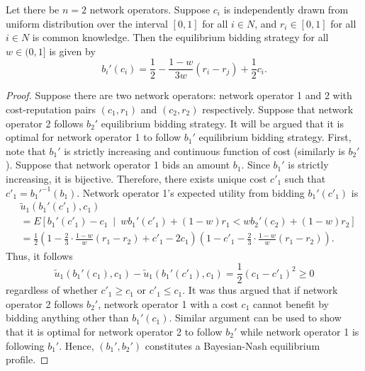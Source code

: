 \begin{propositiona}[\ref{prop:pcomp_equi_bidding_str_direct}]
Let there be $n=2$ network operators. Suppose $c_i$ is independently drawn from uniform distribution over the interval $[0,1]$ for all $i\in N$, and $r_i\in [0,1]$ for all $i\in N$ is common knowledge. Then the equilibrium bidding strategy for all $w\in (0,1]$ is given by
\begin{equation}
	b_i'(c_i) = \frac{1}{2} - \frac{1-w}{3w}(r_i-r_j) + \frac{1}{2}c_i.
\end{equation}
\end{propositiona}
\begin{proof}
Suppose there are two network operators: network operator 1 and 2 with cost-reputation pairs $(c_1,r_1)$ and $(c_2,r_2)$ respectively. Suppose that network operator 2 follows $b_2'$ equilibrium bidding strategy. It will be argued that it is optimal for network operator 1 to follow $b_1'$ equilibrium bidding strategy. First, note that $b_1'$ is strictly increasing and continuous function of cost (similarly is $b_2'$). Suppose that network operator 1 bids an amount $b_1$. Since $b_1'$ is strictly increasing, it is bijective. Therefore, there exists unique cost $c'_1$ such that $c'_1 = {b_1'}^{-1}(b_1)$. Network operator 1's expected utility from bidding $b_1'(c'_1)$ is
\begin{align}
	&\tilde{u}_1(b_1'(c'_1), c_1) \\\nonumber
	&= E \left[ b_1'(c'_1) - c_1 \:\middle\vert\: wb_1'(c'_1) + (1-w)r_1 < wb_2'(c_2) + (1-w)r_2 \right] \\\nonumber
	&= \frac{1}{2} \left( 1 - \frac{2}{3}\cdot\frac{1-w}{w}(r_1-r_2) + c'_1 - 2c_1 \right) \left( 1 - c'_1 - \frac{2}{3}\cdot\frac{1-w}{w}(r_1-r_2) \right).
\end{align}
Thus, it follows
\begin{equation}
	\tilde{u}_1(b_1'(c_1), c_1) - \tilde{u}_1(b_1'(c'_1), c_1) = \frac{1}{2}(c_1-c'_1)^2 \ge 0
\end{equation}
regardless of whether $c'_1\ge c_1$ or $c'_1 \le c_1$. It was thus argued that if network operator 2 follows $b_2'$, network operator 1 with a cost $c_1$ cannot benefit by bidding anything other than $b_1'(c_1)$. Similar argument can be used to show that it is optimal for network operator 2 to follow $b_2'$ while network operator 1 is following $b_1'$. Hence, $(b_1',b_2')$ constitutes a Bayesian-Nash equilibrium profile.
\end{proof}


